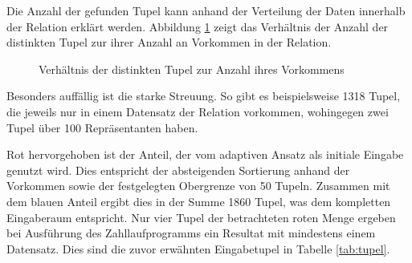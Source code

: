 Die Anzahl der gefunden Tupel kann anhand der Verteilung der Daten innerhalb der Relation erklärt werden.
Abbildung \ref{fig:combverteilung} zeigt das Verhältnis der Anzahl der distinkten Tupel zur ihrer Anzahl an Vorkommen in der Relation.



\begin{figure}[h]
\centering
	\caption{Verhältnis der distinkten Tupel zur Anzahl ihres Vorkommens}
	\label{fig:combverteilung}
\end{figure}

Besonders auffällig ist die starke Streuung.
So gibt es beispielsweise 1318 Tupel, die jeweils nur in einem Datensatz der Relation vorkommen, wohingegen zwei Tupel über 100 Repräsentanten haben.

Rot hervorgehoben ist der Anteil, der vom adaptiven Ansatz als initiale Eingabe genutzt wird.
Dies entspricht der absteigenden Sortierung anhand der Vorkommen sowie der festgelegten Obergrenze von 50 Tupeln.
Zusammen mit dem blauen Anteil ergibt dies in der Summe 1860 Tupel, was dem kompletten Eingaberaum entspricht.
Nur vier Tupel der betrachteten roten Menge ergeben bei Ausführung des Zahllaufprogramms ein Resultat mit mindestens einem Datensatz.
Dies sind die zuvor erwähnten Eingabetupel in Tabelle \ref{tab:tupel}.

